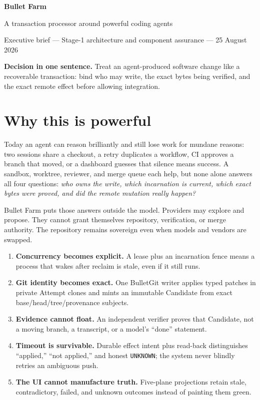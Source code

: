 \documentclass[11pt,letterpaper]{article}
\newcommand{\statusbox}[1]{\colorbox{blue!8}{\parbox{.96\linewidth}{#1}}}
\begin{document}
\begin{center}
{\LARGE\bfseries Bullet Farm}\par
\vspace{3pt}
{\Large A transaction processor around powerful coding agents}\par
\vspace{5pt}
{\small Executive brief --- Stage-1 architecture and component assurance --- 25 August 2026}
\end{center}

\statusbox{\textbf{Decision in one sentence.} Treat an agent-produced software
change like a recoverable transaction: bind who may write, the exact bytes
being verified, and the exact remote effect before allowing integration.}

\section*{Why this is powerful}

Today an agent can reason brilliantly and still lose work for mundane reasons:
two sessions share a checkout, a retry duplicates a workflow, CI approves a
branch that moved, or a dashboard guesses that silence means success. A
sandbox, worktree, reviewer, and merge queue each help, but none alone answers
all four questions: \emph{who owns the write, which incarnation is current,
which exact bytes were proved, and did the remote mutation really happen?}

Bullet Farm puts those answers outside the model. Providers may explore and
propose. They cannot grant themselves repository, verification, or merge
authority. The repository remains sovereign even when models and vendors are
swapped.

\begin{enumerate}
\item \textbf{Concurrency becomes explicit.} A lease plus an incarnation fence
means a process that wakes after reclaim is stale, even if it still runs.
\item \textbf{Git identity becomes exact.} One BulletGit writer applies typed
patches in private Attempt clones and mints an immutable Candidate from exact
base/head/tree/provenance subjects.
\item \textbf{Evidence cannot float.} An independent verifier proves that
Candidate, not a moving branch, a transcript, or a model's ``done'' statement.
\item \textbf{Timeout is survivable.} Durable effect intent plus read-back
distinguishes ``applied,'' ``not applied,'' and honest \texttt{UNKNOWN}; the
system never blindly retries an ambiguous push.
\item \textbf{The UI cannot manufacture truth.} Five-plane projections retain
stale, contradictory, failed, and unknown outcomes instead of painting them
green.
\end{enumerate}
\end{document}
